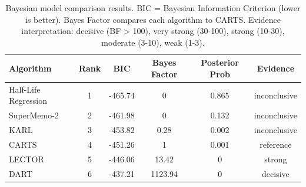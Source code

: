 \begin{table}[htbp]
\centering
\caption{Bayesian Model Comparison}
\begin{tabular}{lccccc}
\toprule
Algorithm & Rank & BIC & Bayes Factor & Posterior Prob & Evidence \\
\midrule
Half-Life Regression & 1 & -465.74 & 0 & 0.865 & inconclusive \\
SuperMemo-2 & 2 & -461.98 & 0 & 0.132 & inconclusive \\
KARL & 3 & -453.82 & 0.28 & 0.002 & inconclusive \\
CARTS & 4 & -451.26 & 1 & 0.001 & reference \\
LECTOR & 5 & -446.06 & 13.42 & 0 & strong \\
DART & 6 & -437.21 & 1123.94 & 0 & decisive \\
\bottomrule
\end{tabular}
\label{tab:bayesian-model-comparison}
\caption*{Bayesian model comparison results. BIC = Bayesian Information Criterion (lower is better). Bayes Factor compares each algorithm to CARTS. Evidence interpretation: decisive (BF > 100), very strong (30-100), strong (10-30), moderate (3-10), weak (1-3).}
\end{table}
